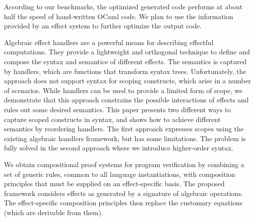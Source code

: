 \documentclass[a4paper,UKenglish]{dagrep}
\begin{document}
According to our benchmarks, the optimized generated code performs at about half the speed of hand-written OCaml code. We plan to use the information provided by an effect system to further optimize the output code.

\license
{}

Algebraic effect handlers are a powerful means for describing
effectful computations. They provide a lightweight and orthogonal
technique to define and compose the syntax and semantics of
different effects. The semantics is captured by handlers, which are
functions that transform syntax trees.
Unfortunately, the approach does not support syntax for scoping
constructs, which arise in a number of scenarios. While handlers can
be used to provide a limited form of scope, we demonstrate that this
approach constrains the possible interactions of effects and rules out
some desired semantics.
This paper presents two different ways to capture scoped constructs
in syntax, and shows how to achieve different semantics by
reordering handlers. The first approach expresses scopes using the
existing algebraic handlers framework, but has some limitations. The
problem is fully solved in the second approach where we introduce
higher-order syntax.

\license

We obtain compositional proof systems for program verification by combining a set of generic rules, common to all language instantiations, with composition principles that must be supplied on an effect-specific basis. The proposed framework considers effects as generated by a signature of algebraic operations. The effect-specific composition principles then replace the customary equations (which are derivable from them).

\license
{}
\end{document}
